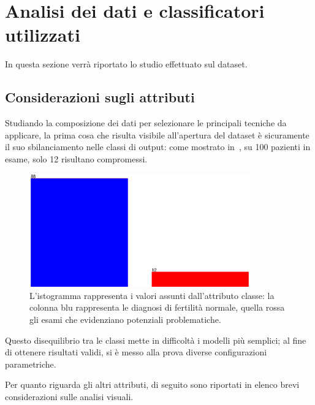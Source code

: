 \section{Analisi dei dati e classificatori utilizzati}

In questa sezione verrà riportato lo studio effettuato sul dataset.

\subsection{Considerazioni sugli attributi}

Studiando la composizione dei dati per selezionare le principali tecniche da applicare,
la prima cosa che risulta visibile all'apertura del dataset è sicuramente il suo sbilanciamento nelle classi di output:
come mostrato in~, su 100 pazienti in esame, solo 12 risultano compromessi.

\begin{figure}[H]
  \centering
  \includegraphics[width=0.85\textwidth]{fig/classes.eps}%
  \caption{%
    L'istogramma rappresenta i valori assunti dall'attributo classe:
    la colonna blu rappresenta le diagnosi di fertilità normale,
    quella rossa gli esami che evidenziano potenziali problematiche.
  }%
  \label{fig:classes}
\end{figure}

Questo disequilibrio tra le classi mette in difficoltà i modelli più semplici;
al fine di ottenere risultati validi, si è messo alla prova diverse configurazioni parametriche.

Per quanto riguarda gli altri attributi, di seguito sono riportati in elenco brevi considerazioni sulle analisi visuali.

